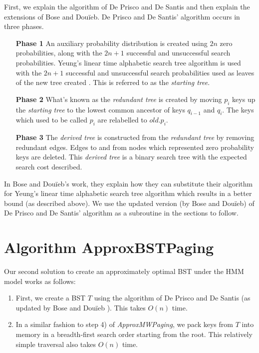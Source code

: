 \documentclass[letterpaper,12pt,titlepage,oneside,final]{book}
\theoremstyle{plain}
\begin{document}
First, we explain the algorithm of De Prisco and De Santis and then explain the extensions of Bose and Dou\"{i}eb. De Prisco and De Santis' algorithm occurs in three phases.

\begin{itemize}
\item[\textbf{Phase 1}] An auxiliary probability distribution is created using $2n$ zero probabilities, along with the $2n+1$ successful and unsuccessful search probabilities. Yeung's linear time alphabetic search tree algorithm is used with the $2n+1$ successful and unsuccessful search probabilities used as leaves of the new tree created \cite{yeung1991alphabetic}. This is referred to as the \textit{starting tree}.

\item[\textbf{Phase 2}] What's known as the \textit{redundant tree} is created by moving $p_i$ keys up the \textit{starting tree} to the lowest common ancestor of keys $q_{i-1}$ and $q_i$. The keys which used to be called $p_i$ are relabelled to $old.p_i$.

\item[\textbf{Phase 3}] The \textit{derived tree} is constructed from the \textit{redundant tree} by removing redundant edges. Edges to and from nodes which represented zero probability keys are deleted. This \textit{derived tree} is a binary search tree with the expected search cost described.
\end{itemize}


In Bose and Dou\"{i}eb's work, they explain how they can substitute their algorithm for Yeung's linear time alphabetic search tree algorithm which results in a better bound (as described above). We use the updated version (by Bose and Dou\"{i}eb) of De Prisco and De Santis' algorithm as a subroutine in the sections to follow.

\section{Algorithm ApproxBSTPaging}\label{Algorithm ApproxBSTPaging}

Our second solution to create an approximately optimal BST under the HMM model works as follows: \\

\begin{enumerate}
\item First, we create a BST $T$ using the algorithm of De Prisco and De Santis \cite{de1993binary} (as updated by Bose and Dou\"{i}eb \cite{bose2009efficient}). This takes $O(n)$ time. \\

\item In a similar fashion to step 4) of \textit{ApproxMWPaging}, we pack keys from $T$ into memory in a breadth-first search order starting from the root. This relatively simple traversal also takes $O(n)$ time.
\end{enumerate}
\end{document}
